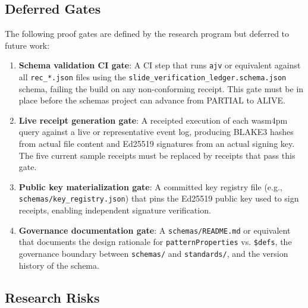 \subsection{Deferred Gates}
\label{sec:schemas-open-questions-deferred}

The following proof gates are defined by the research program but deferred to future work:

\begin{enumerate}
  \item \textbf{Schema validation CI gate}: A CI step that runs \texttt{ajv} or equivalent
    against all \texttt{rec\_*.json} files using the \texttt{slide\_verification\_ledger.schema.json}
    schema, failing the build on any non-conforming receipt. This gate must be in place before
    the schemas project can advance from PARTIAL to ALIVE.
  \item \textbf{Live receipt generation gate}: A receipted execution of each wasm4pm query
    against a live or representative event log, producing BLAKE3 hashes from actual file content
    and Ed25519 signatures from an actual signing key. The five current sample receipts must be
    replaced by receipts that pass this gate.
  \item \textbf{Public key materialization gate}: A committed key registry file (e.g.,
    \texttt{schemas/key\_registry.json}) that pins the Ed25519 public key used to sign receipts,
    enabling independent signature verification.
  \item \textbf{Governance documentation gate}: A \texttt{schemas/README.md} or equivalent that
    documents the design rationale for \texttt{patternProperties} vs. \texttt{\$defs}, the
    governance boundary between \texttt{schemas/} and \texttt{standards/}, and the version
    history of the schema.
\end{enumerate}

\subsection{Research Risks}
\label{sec:schemas-open-questions-risks}

